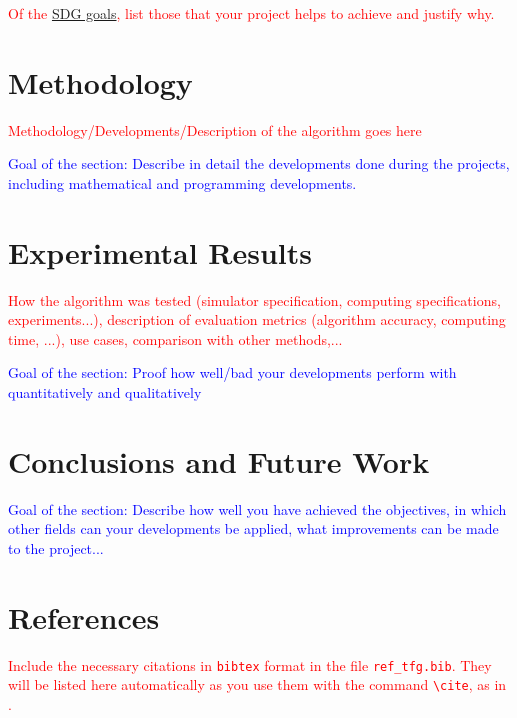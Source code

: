 \documentclass[12pt]{extarticle}
\numberwithin{equation}{section}
\begin{document}
\begin{refsection}
\textcolor{red}{Of the \href{https://sdgs.un.org/goals}{SDG goals}, list those that your project helps to achieve and justify why.}

\newpage

\section{Methodology}\label{sec:methodology}
\textcolor{red}{Methodology/Developments/Description of the algorithm goes here}

\textcolor{blue}{Goal of the section: Describe in detail the developments done during the projects, including mathematical and programming developments.}

\newpage

\section{Experimental Results}\label{sec:results}

\textcolor{red}{How the algorithm was tested (simulator specification, computing specifications, experiments...), description of evaluation metrics (algorithm accuracy, computing time, ...), use cases, comparison with other methods,...}

\textcolor{blue}{Goal of the section: Proof how well/bad your developments perform with quantitatively and qualitatively}

\newpage

\section{Conclusions and Future Work}\label{sec:conclusion}
\textcolor{blue}{Goal of the section: Describe how well you have achieved the objectives, in which other fields can your developments be applied, what improvements can be made to the project...}

\newpage

\section{References} \label{sec:bibliography}
\textcolor{red}{Include the necessary citations in \texttt{bibtex} format in the file \texttt{ref\_tfg.bib}. They will be listed here automatically as you use them with the command \texttt{\textbackslash cite}, as in \cite{einstein1905}.} 

\printbibliography[heading=none]

\end{refsection}
\end{document}
